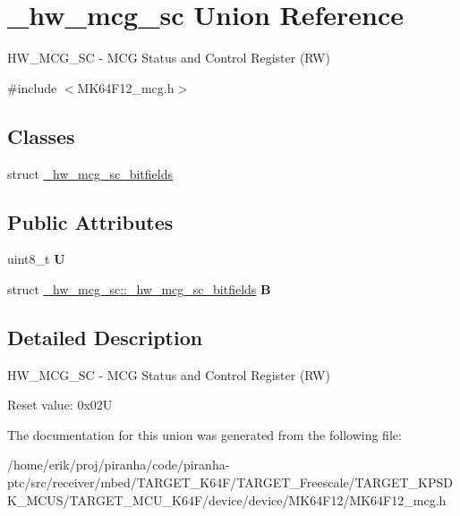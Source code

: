 \hypertarget{union__hw__mcg__sc}{}\section{\+\_\+hw\+\_\+mcg\+\_\+sc Union Reference}
\label{union__hw__mcg__sc}


H\+W\+\_\+\+M\+C\+G\+\_\+\+SC -\/ M\+CG Status and Control Register (RW)  




{\ttfamily \#include $<$M\+K64\+F12\+\_\+mcg.\+h$>$}

\subsection*{Classes}
\begin{DoxyCompactItemize}
\item 
struct \hyperlink{struct__hw__mcg__sc_1_1__hw__mcg__sc__bitfields}{\+\_\+hw\+\_\+mcg\+\_\+sc\+\_\+bitfields}
\end{DoxyCompactItemize}
\subsection*{Public Attributes}
\begin{DoxyCompactItemize}
\item 
uint8\+\_\+t {\bfseries U}\hypertarget{union__hw__mcg__sc_af20bd6dc509fd222c39c4d5fd2f38940}{}\label{union__hw__mcg__sc_af20bd6dc509fd222c39c4d5fd2f38940}

\item 
struct \hyperlink{struct__hw__mcg__sc_1_1__hw__mcg__sc__bitfields}{\+\_\+hw\+\_\+mcg\+\_\+sc\+::\+\_\+hw\+\_\+mcg\+\_\+sc\+\_\+bitfields} {\bfseries B}\hypertarget{union__hw__mcg__sc_adfb8373b3c863b41a92537f98346922f}{}\label{union__hw__mcg__sc_adfb8373b3c863b41a92537f98346922f}

\end{DoxyCompactItemize}


\subsection{Detailed Description}
H\+W\+\_\+\+M\+C\+G\+\_\+\+SC -\/ M\+CG Status and Control Register (RW) 

Reset value\+: 0x02U 

The documentation for this union was generated from the following file\+:\begin{DoxyCompactItemize}
\item 
/home/erik/proj/piranha/code/piranha-\/ptc/src/receiver/mbed/\+T\+A\+R\+G\+E\+T\+\_\+\+K64\+F/\+T\+A\+R\+G\+E\+T\+\_\+\+Freescale/\+T\+A\+R\+G\+E\+T\+\_\+\+K\+P\+S\+D\+K\+\_\+\+M\+C\+U\+S/\+T\+A\+R\+G\+E\+T\+\_\+\+M\+C\+U\+\_\+\+K64\+F/device/device/\+M\+K64\+F12/M\+K64\+F12\+\_\+mcg.\+h\end{DoxyCompactItemize}
